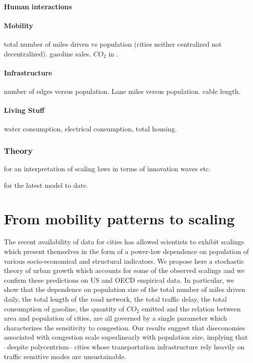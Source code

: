 \paragraph{Human interactions} \cite{Schlapfer:2014}

\paragraph{Mobility} \cite{Samaniego:2008} total number of miles driven vs
population (cities neither centralized not decentralized).
\cite{Bettencourt:2007} gasoline sales. $CO_2$ in \cite{Fragkias:2013,
Oliveira:2014, Rybksi:2013}.

\paragraph{Infrastructure} \cite{Veregin:1997} number of edges versus population.
\cite{Samaniego:2008} Lane miles versus population. \cite{Bettencourt:2007}
cable length.

\paragraph{Living Stuff} \cite{Bettencourt:2007} water consumption, electrical
consumption, total housing.

    \subsubsection{Theory}
    \label{ssub:theory}
    
\cite{Pumain:2006} for an interpretation of scaling laws in terms of
innovation waves etc.

\cite{Bettencourt:2013} for the latest model to date.


\section{From mobility patterns to scaling}
\label{sec:from_mobility_patterns_to_scaling}


The recent availability of data for cities has allowed scientists to exhibit scalings which present themselves in the form of a power-law dependence on population of various socio-economical and structural indicators. We propose here a stochastic theory of urban growth which accounts for some of the observed scalings and we confirm these predictions on US and OECD empirical data. In particular, we show that the dependence on population size of the total number of miles driven daily, the total length of the road network, the total traffic delay, the total consumption of gasoline, the quantity of $CO_2$ emitted and the relation between area and population of cities, are all governed by a single parameter which characterizes the sensitivity to congestion. Our results suggest that diseconomies associated with congestion scale superlinearly with population size, implying that --despite polycentrism-- cities whose transportation infrastructure rely heavily on traffic sensitive modes are unsustainable.



